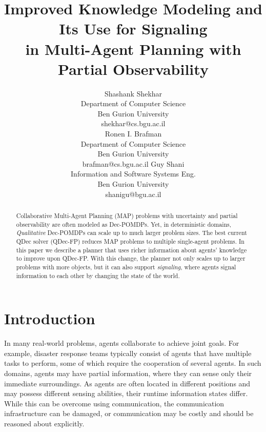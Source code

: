 \documentclass[letterpaper]{article}
\theoremstyle{definition}
\begin{document}
\title{Improved Knowledge Modeling and Its Use for Signaling\\ in Multi-Agent Planning with Partial Observability}

\author{
Shashank Shekhar\\
Department of Computer Science\\
Ben Gurion University\\
shekhar@cs.bgu.ac.il\\
\And
Ronen I. Brafman\\
Department of Computer Science\\
Ben Gurion University\\
brafman@cs.bgu.ac.il
\And
Guy Shani\\
Information and Software Systems Eng.\\
Ben Gurion University\\
shanigu@bgu.ac.il
}

\maketitle

\begin{abstract}
Collaborative Multi-Agent Planning (MAP)
problems with uncertainty and partial observability
are often modeled as Dec-POMDPs. Yet,
in deterministic domains, {\em Qualitative}
Dec-POMDPs can scale up to much larger problem sizes.
The best current QDec solver
(QDec-FP)
reduces MAP problems to multiple single-agent problems.
In this paper we describe a planner that uses richer information about agents' knowledge to improve upon QDec-FP.
With this change, the planner not only scales up to larger problems with more objects, but it can also support
{\em signaling}, where agents signal information to each other by changing the state of the world.
\end{abstract}

\section{Introduction}

In many real-world problems, agents collaborate to achieve joint goals. For example, disaster response teams typically consist of agents that have multiple tasks to perform,
some of which require the cooperation of several agents.
In such domains, agents may have partial information, where they can sense only their immediate surroundings.
As agents are often located in different positions and may possess different sensing abilities, their runtime information states differ.  While this can be overcome using communication, the communication infrastructure can be damaged, or communication may be costly and should be reasoned about explicitly.
\end{document}
